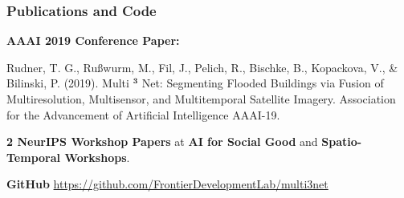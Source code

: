 \begin{frame}
\frametitle{Publications and Code}



\textbf{AAAI 2019 Conference Paper:}

{\small
Rudner, T. G., Rußwurm, M., Fil, J., Pelich, R., Bischke, B., Kopackova, V., \& Bilinski, P. (2019). Multi $^{\mathbf {3}} $ Net: Segmenting Flooded Buildings via Fusion of Multiresolution, Multisensor, and Multitemporal Satellite Imagery. Association for the Advancement of Artificial Intelligence AAAI-19.}

\vspace{2em}

\textbf{2 NeurIPS Workshop Papers} at \textbf{AI for Social Good} and \textbf{Spatio-Temporal Workshops}.

%
%
%

\vspace{1em}
\textbf{GitHub}
\url{https://github.com/FrontierDevelopmentLab/multi3net}

\end{frame}